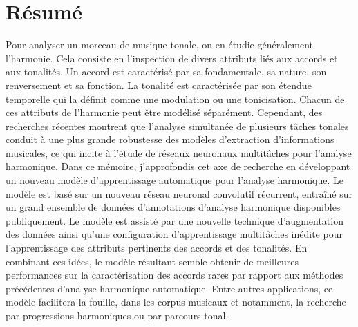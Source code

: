 \chapter*{R\'esum\'e}
\label{chap:abstract-fr}

Pour analyser un morceau de musique tonale, on en étudie
généralement l'harmonie. Cela consiste en l'inspection de
divers attributs liés aux accords et aux tonalités. Un
accord est caractérisé par sa fondamentale, sa nature, son
renversement et sa fonction. La tonalité est caractérisée
par son étendue temporelle qui la définit comme une
modulation ou une tonicisation. Chacun de ces attributs de
l'harmonie peut être modélisé séparément. Cependant, des
recherches récentes montrent que l'analyse simultanée de
plusieurs tâches tonales conduit à une plus grande
robustesse des modèles d'extraction d'informations
musicales, ce qui incite à l'étude de réseaux neuronaux
multitâches pour l'analyse harmonique. Dans ce mémoire,
j'approfondis cet axe de recherche en développant un nouveau
modèle d'apprentissage automatique pour l'analyse
harmonique. Le modèle est basé sur un nouveau réseau
neuronal convolutif récurrent, entraîné sur un grand
ensemble de données d'annotations d'analyse harmonique
disponibles publiquement. Le modèle est assisté par une
nouvelle technique d'augmentation des données ainsi qu'une
configuration d'apprentissage multitâches inédite pour
l'apprentissage des attributs pertinents des accords et des
tonalités. En combinant ces idées, le modèle résultant
semble obtenir de meilleures performances sur la
caractérisation des accords rares par rapport aux méthodes
précédentes d'analyse harmonique automatique. Entre autres
applications, ce modèle facilitera la fouille, dans les
corpus musicaux et notamment, la recherche par progressions
harmoniques ou par parcours tonal.

